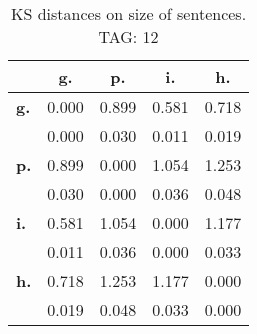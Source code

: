 \begin{table}[h!]
\begin{center}
\begin{tabular}{| l || c | c | c | c |}\hline
 & {\bf g.} & {\bf p.} & {\bf i.} & {\bf h.} \\\hline\hline
{\bf g.} & 0.000 & 0.899 & 0.581 & 0.718 \\
{\bf } & 0.000 & 0.030 & 0.011 & 0.019 \\\hline
{\bf p.} & 0.899 & 0.000 & 1.054 & 1.253 \\
{\bf } & 0.030 & 0.000 & 0.036 & 0.048 \\\hline
{\bf i.} & 0.581 & 1.054 & 0.000 & 1.177 \\
{\bf } & 0.011 & 0.036 & 0.000 & 0.033 \\\hline
{\bf h.} & 0.718 & 1.253 & 1.177 & 0.000 \\
{\bf } & 0.019 & 0.048 & 0.033 & 0.000 \\\hline
\end{tabular}
\caption{KS distances on size of sentences. TAG: 12}
\end{center}
\end{table}